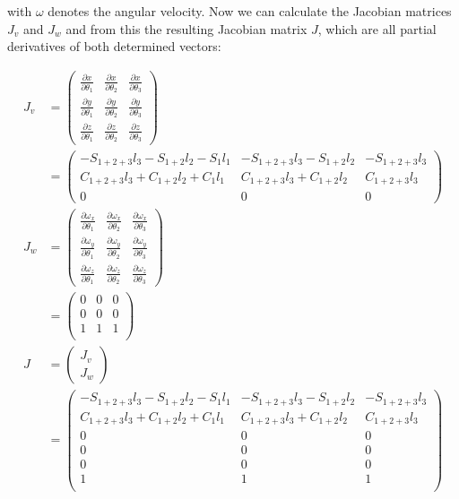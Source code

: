 \documentclass[a4paper,11pt]{article}
\begin{document}
\begin {enumerate}
		with $\omega$ denotes the angular velocity. Now we can calculate the Jacobian matrices $J_v$ and $J_w$ and from this the resulting Jacobian matrix $J$, which are all partial derivatives of both determined vectors:
		
		\begin{align*}
			J_v &= \begin{pmatrix}
				\frac{\partial x}{\partial \theta_1} & \frac{\partial x}{\partial \theta_2} & \frac{\partial x}{\partial \theta_3} \\
				\frac{\partial y}{\partial \theta_1} & \frac{\partial y}{\partial \theta_2} & \frac{\partial y}{\partial \theta_3} \\
				\frac{\partial z}{\partial \theta_1} & \frac{\partial z}{\partial \theta_2} & \frac{\partial z}{\partial \theta_3}
			\end{pmatrix} \\
			&= \begin{pmatrix}
				-S_{1+2+3}l_3 - S_{1+2}l_2 - S_1l_1 & -S_{1+2+3}l_3 - S_{1+2}l_2 & -S_{1+2+3}l_3\\
				C_{1+2+3}l_3 + C_{1+2}l_2 + C_1l_1 & C_{1+2+3}l_3 + C_{1+2}l_2 & C_{1+2+3}l_3\\
				0 & 0 & 0
			\end{pmatrix}\\
			J_w &= \begin{pmatrix}
				\frac{\partial \omega_x}{\partial \theta_1} & \frac{\partial \omega_x}{\partial \theta_2} & \frac{\partial \omega_x}{\partial \theta_3} \\
				\frac{\partial \omega_y}{\partial \theta_1} & \frac{\partial \omega_y}{\partial \theta_2} & \frac{\partial \omega_y}{\partial \theta_3} \\
				\frac{\partial \omega_z}{\partial \theta_1} & \frac{\partial \omega_z}{\partial \theta_2} & \frac{\partial \omega_z}{\partial \theta_3}
			\end{pmatrix} \\
			&= \begin{pmatrix}
				0 & 0 & 0 \\
				0 & 0 & 0 \\
				1 & 1 & 1 \\
			\end{pmatrix}\\
			J &= \begin{pmatrix}
				J_v\\
				J_w
			\end{pmatrix}\\
			&= \begin{pmatrix}
				-S_{1+2+3}l_3 - S_{1+2}l_2 - S_1l_1 & -S_{1+2+3}l_3 - S_{1+2}l_2 & -S_{1+2+3}l_3\\
				C_{1+2+3}l_3 + C_{1+2}l_2 + C_1l_1 & C_{1+2+3}l_3 + C_{1+2}l_2 & C_{1+2+3}l_3\\
				0 & 0 & 0\\
				0 & 0 & 0 \\
				0 & 0 & 0 \\
				1 & 1 & 1 \\
			\end{pmatrix}\\
		\end{align*}
		

\end{enumerate}
\end{document}
